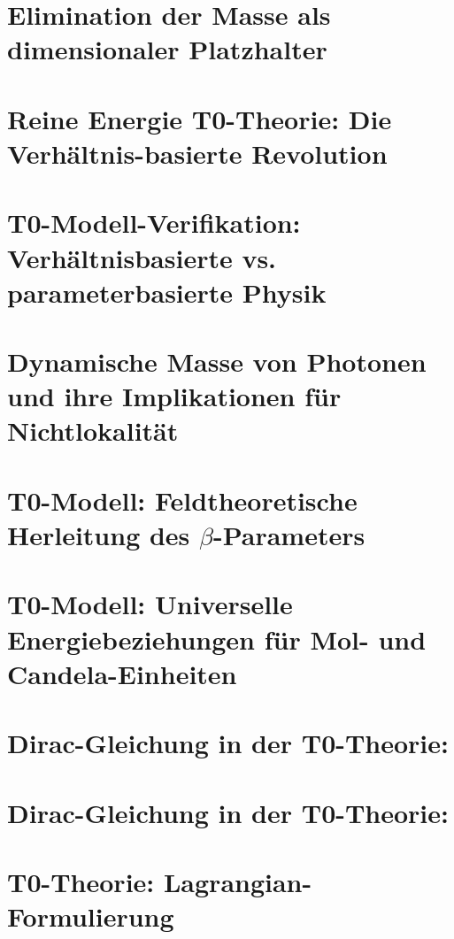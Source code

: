 	\chapter{Elimination der Masse als dimensionaler Platzhalter}
	
	\chapter{Reine Energie T0-Theorie: Die Verhältnis-basierte Revolution}
	
	\chapter{T0-Modell-Verifikation: Verhältnisbasierte vs. parameterbasierte Physik}
	
	\chapter{Dynamische Masse von Photonen und ihre Implikationen für Nichtlokalität}
	
	\chapter{T0-Modell: Feldtheoretische Herleitung des $\beta$-Parameters}
	
	\chapter{T0-Modell: Universelle Energiebeziehungen für Mol- und Candela-Einheiten}
	
	\chapter{Dirac-Gleichung in der T0-Theorie:}
	
	\chapter{Dirac-Gleichung in der T0-Theorie:}
	
	\chapter{T0-Theorie: Lagrangian-Formulierung}
	

